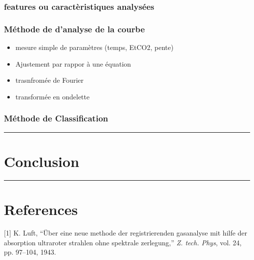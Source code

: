\documentclass[12pt,]{article}
\providecommand{\tightlist}{%
  \setlength{\itemsep}{0pt}\setlength{\parskip}{0pt}}
\begin{document}
\subsubsection{features ou caractèristiques
analysées}\label{features-ou-caracteristiques-analysees}

\subsubsection{Méthode de d'analyse de la
courbe}\label{methode-de-danalyse-de-la-courbe}

\begin{itemize}
\tightlist
\item
  mesure simple de paramètres (temps, EtCO2, pente)
\item
  Ajustement par rappor à une équation
\item
  trasnfromée de Fourier
\item
  transformée en ondelette
\end{itemize}

\subsubsection{Méthode de
Classification}\label{methode-de-classification}

\pagebreak

\begin{center}\rule{0.5\linewidth}{\linethickness}\end{center}

\section{Conclusion}\label{conclusion}

\pagebreak

\begin{center}\rule{0.5\linewidth}{\linethickness}\end{center}

\section*{References}\label{references}

\hypertarget{refs}{}
\hypertarget{ref-luft1943neue}{}
{[}1{]} K. Luft, ``Über eine neue methode der registrierenden gasanalyse
mit hilfe der absorption ultraroter strahlen ohne spektrale zerlegung,''
\emph{Z. tech. Phys}, vol. 24, pp. 97--104, 1943.
\end{document}
